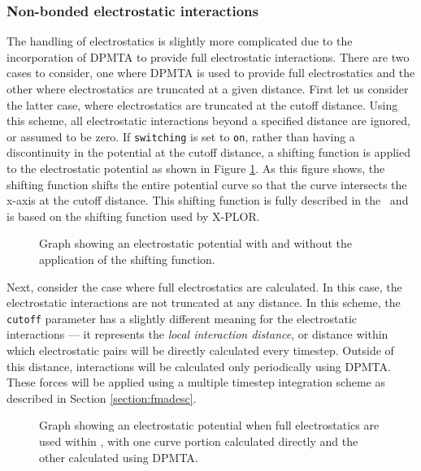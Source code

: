 \subsubsection{Non-bonded electrostatic interactions}
The handling of electrostatics is slightly
more complicated due to the incorporation of DPMTA to provide full
electrostatic interactions.  There are two cases to consider, one where
DPMTA is used to provide full electrostatics and the other where electrostatics
are truncated at a given distance.  
\prettypar
First let us consider the latter case, where electrostatics are truncated at
the cutoff distance.  Using this scheme, all electrostatic interactions
beyond a specified distance are ignored, or assumed to be zero.  If
\verb!switching! is set to \verb!on!, rather than having a discontinuity
in the potential
at the cutoff distance, a shifting function is applied to the electrostatic
potential as shown in Figure \ref{fig:shifting}.  As this figure shows, the
shifting function shifts the entire potential curve so that the curve
intersects the x-axis at the cutoff distance.  This shifting function
is fully described in the \PG\ and is based on the
shifting function used by X-PLOR.

\begin{figure}[htb]
  \caption[Graph of electrostatic potential with and without shifting function]
  {\small Graph showing an electrostatic potential with and without the
  application of the shifting function.}
  \label{fig:shifting}
\end{figure}

Next, consider the case where full electrostatics are calculated.  In this
case, the electrostatic interactions are not truncated at any distance.  In
this scheme, the \verb!cutoff! parameter has a slightly different meaning
for the electrostatic interactions --- it represents
the {\it local interaction distance\/}, or distance within which electrostatic
pairs will be directly calculated every timestep.  Outside of this distance,
interactions will be calculated only periodically using DPMTA.  These forces
will be applied using a multiple timestep integration scheme as described in
Section \ref{section:fmadesc}.

\begin{figure}[htb]
  \caption[Graph of electrostatic split between short and long range forces]
  {\small Graph showing an electrostatic potential 
  when full electrostatics are used within \NAMD, 
  with one curve portion calculated directly 
  and the other calculated using DPMTA.}
  \label{fig:fmaOn}
\end{figure}

